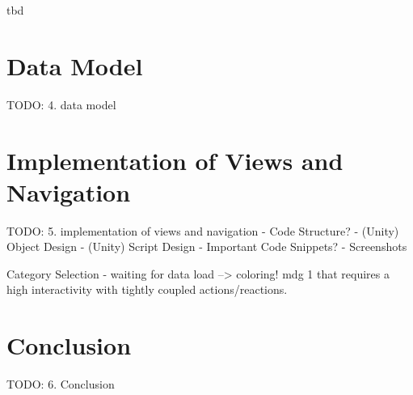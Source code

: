 tbd



\section{Data Model}


TODO:
4. data model




\section{Implementation of Views and Navigation}


TODO:
5. implementation of views and navigation
- Code Structure?
- (Unity) Object Design
- (Unity) Script Design
- Important Code Snippets?
- Screenshots



Category Selection - waiting for data load --> coloring!
\gls{mdg} 1 that requires a high interactivity with tightly coupled actions/reactions.



\section{Conclusion}


TODO:
6. Conclusion





